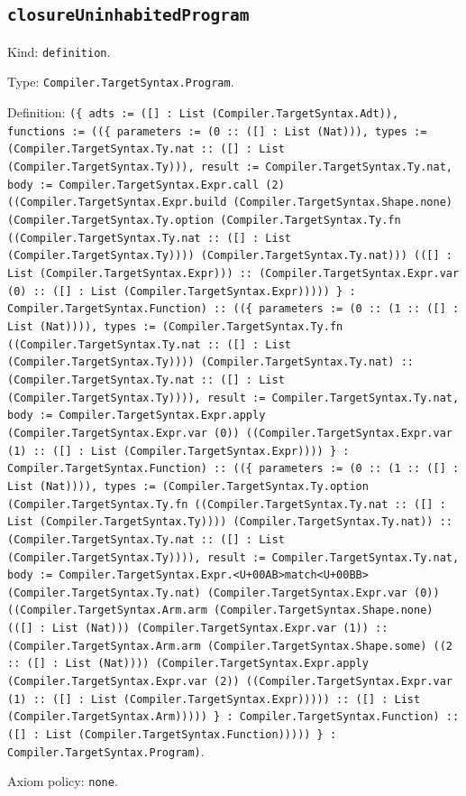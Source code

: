 \documentclass[11pt]{article}
\begin{document}
\subsection*{\texttt{closureUninhabitedProgram}}
\noindent Kind: \texttt{definition}.\par
\noindent Type: \texttt{Compiler.TargetSyntax.Program}.\par
\noindent Definition: \texttt{(\{ adts := ([] : List (Compiler.TargetSyntax.Adt)), functions := ((\{ parameters := (0 :: ([] : List (Nat))), types := (Compiler.TargetSyntax.Ty.nat :: ([] : List (Compiler.TargetSyntax.Ty))), result := Compiler.TargetSyntax.Ty.nat, body := Compiler.TargetSyntax.Expr.call (2) ((Compiler.TargetSyntax.Expr.build (Compiler.TargetSyntax.Shape.none) (Compiler.TargetSyntax.Ty.option (Compiler.TargetSyntax.Ty.fn ((Compiler.TargetSyntax.Ty.nat :: ([] : List (Compiler.TargetSyntax.Ty)))) (Compiler.TargetSyntax.Ty.nat))) (([] : List (Compiler.TargetSyntax.Expr))) :: (Compiler.TargetSyntax.Expr.var (0) :: ([] : List (Compiler.TargetSyntax.Expr))))) \} : Compiler.TargetSyntax.Function) :: ((\{ parameters := (0 :: (1 :: ([] : List (Nat)))), types := (Compiler.TargetSyntax.Ty.fn ((Compiler.TargetSyntax.Ty.nat :: ([] : List (Compiler.TargetSyntax.Ty)))) (Compiler.TargetSyntax.Ty.nat) :: (Compiler.TargetSyntax.Ty.nat :: ([] : List (Compiler.TargetSyntax.Ty)))), result := Compiler.TargetSyntax.Ty.nat, body := Compiler.TargetSyntax.Expr.apply (Compiler.TargetSyntax.Expr.var (0)) ((Compiler.TargetSyntax.Expr.var (1) :: ([] : List (Compiler.TargetSyntax.Expr)))) \} : Compiler.TargetSyntax.Function) :: ((\{ parameters := (0 :: (1 :: ([] : List (Nat)))), types := (Compiler.TargetSyntax.Ty.option (Compiler.TargetSyntax.Ty.fn ((Compiler.TargetSyntax.Ty.nat :: ([] : List (Compiler.TargetSyntax.Ty)))) (Compiler.TargetSyntax.Ty.nat)) :: (Compiler.TargetSyntax.Ty.nat :: ([] : List (Compiler.TargetSyntax.Ty)))), result := Compiler.TargetSyntax.Ty.nat, body := Compiler.TargetSyntax.Expr.<U+00AB>match<U+00BB> (Compiler.TargetSyntax.Ty.nat) (Compiler.TargetSyntax.Expr.var (0)) ((Compiler.TargetSyntax.Arm.arm (Compiler.TargetSyntax.Shape.none) (([] : List (Nat))) (Compiler.TargetSyntax.Expr.var (1)) :: (Compiler.TargetSyntax.Arm.arm (Compiler.TargetSyntax.Shape.some) ((2 :: ([] : List (Nat)))) (Compiler.TargetSyntax.Expr.apply (Compiler.TargetSyntax.Expr.var (2)) ((Compiler.TargetSyntax.Expr.var (1) :: ([] : List (Compiler.TargetSyntax.Expr))))) :: ([] : List (Compiler.TargetSyntax.Arm))))) \} : Compiler.TargetSyntax.Function) :: ([] : List (Compiler.TargetSyntax.Function))))) \} : Compiler.TargetSyntax.Program)}.\par
\noindent Axiom policy: \texttt{none}.\par
\end{document}
